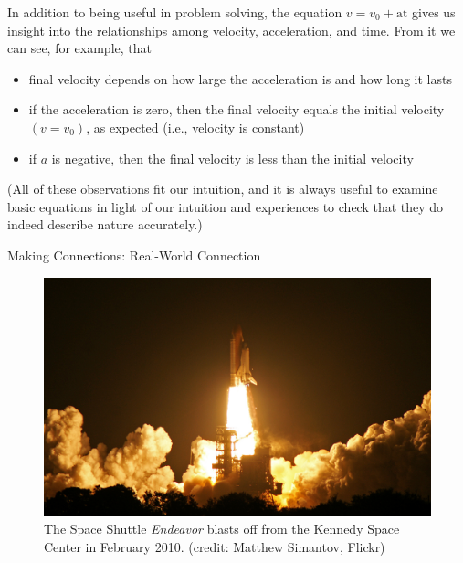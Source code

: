 \documentclass[
]{book}
\providecommand{\tightlist}{%
  \setlength{\itemsep}{0pt}\setlength{\parskip}{0pt}}
\begin{document}
In addition to being useful in problem solving, the equation
\({v = {v_{0} + \text{at}}}{}\) gives us insight into the relationships
among velocity, acceleration, and time. From it we can see, for example,
that

\begin{itemize}
\tightlist
\item
  \protect\hypertarget{import-auto-id2180047}{}{final velocity depends on how large the acceleration is and how
  long it lasts}
\item
  \protect\hypertarget{import-auto-id2180050}{}{if the acceleration is zero, then the final velocity equals the
  initial velocity \({({v = v_{0}})}{}\), as expected (i.e., velocity is
  constant)}
\item
  \protect\hypertarget{import-auto-id2175665}{}{if \emph{\(a{}\)} is negative, then the final velocity is less than the
  initial velocity}
\end{itemize}

(All of these observations fit our intuition, and it is always useful to
examine basic equations in light of our intuition and experiences to
check that they do indeed describe nature accurately.)

\hypertarget{fs-id1164906437247}{}
Making Connections: Real-World Connection

{\hfill\break
}

\begin{figure}
\hypertarget{import-auto-id2180893}{%
\centering
\includegraphics{images/Figure_02_04_01a.jpg}
\caption{The Space Shuttle \emph{Endeavor} blasts off from the Kennedy Space Center
in February 2010. (credit: Matthew Simantov,
Flickr)}\label{import-auto-id2180893}
}
\end{figure}
\end{document}
